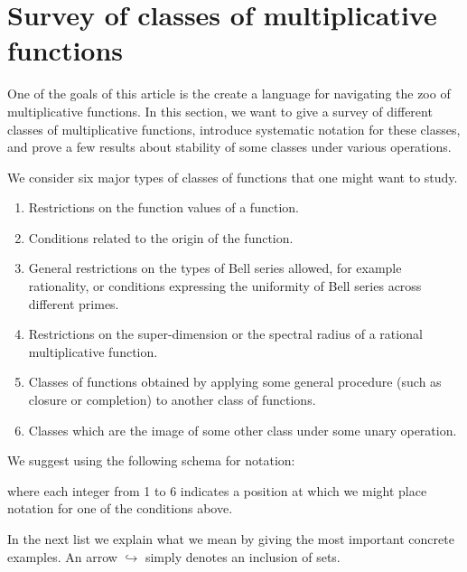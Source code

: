 
\section{Survey of classes of multiplicative functions}

One of the goals of this article is the create a language for navigating the zoo of multiplicative functions. In this section, we want to give a survey of different classes of multiplicative functions, introduce systematic notation for these classes, and prove a few results about stability of some classes under various operations.

We consider six major types of classes of functions that one might want to study.

\begin{enumerate}
\item Restrictions on the function values of a function.
\item Conditions related to the origin of the function.
\item General restrictions on the types of Bell series allowed, for example rationality, or conditions expressing the uniformity of Bell series across different primes.
\item Restrictions on the super-dimension or the spectral radius of a rational multiplicative function.
\item Classes of functions obtained by applying some general procedure (such as closure or completion) to another class of functions.
\item Classes which are the image of some other class under some unary operation.
\end{enumerate}
We suggest using the following schema for notation:
\begin{center}
\end{center}
where each integer from 1 to 6 indicates a position at which we might place notation for one of the conditions above. 

In the next list we explain what we mean by giving the most important concrete examples. An arrow $\hookrightarrow$ simply denotes an inclusion of sets.

